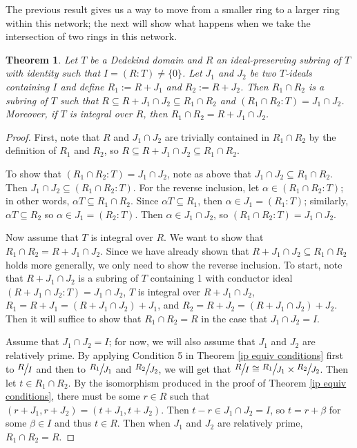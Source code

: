 \documentclass[12pt]{amsart}
\newtheorem{theorem}{Theorem}[section]
\theoremstyle{definition}
\newcommand{\quot}[2]{\large\sfrac{#1}{#2}\normalsize}
\begin{document}
	The previous result gives us a way to move from a smaller ring to a larger ring within this network; the next will show what happens when we take the intersection of two rings in this network.
	
	\begin{theorem}
		\label{ip intersect cond ideals}
		Let $T$ be a Dedekind domain and $R$ an ideal-preserving subring of $T$ with identity such that $I=(R:T)\neq \{0\}$. Let $J_1$ and $J_2$ be two $T$-ideals containing $I$ and define $R_1:=R+J_1$ and $R_2:=R+J_2$. Then $R_1\cap R_2$ is a subring of $T$ such that $R\subseteq R+J_1\cap J_2\subseteq R_1\cap R_2$ and $(R_1\cap R_2:T)=J_1\cap J_2$. Moreover, if $T$ is integral over $R$, then $R_1\cap R_2=R+J_1\cap J_2$.
	\end{theorem}
	
	\begin{proof}
		First, note that $R$ and $J_1\cap J_2$ are trivially contained in $R_1\cap R_2$ by the definition of $R_1$ and $R_2$, so $R\subseteq R+J_1\cap J_2\subseteq R_1\cap R_2$. 
		
		To show that $(R_1\cap R_2:T)=J_1\cap J_2$, note as above that $J_1\cap J_2\subseteq R_1\cap R_2$. Then $J_1\cap J_2\subseteq (R_1\cap R_2:T)$. For the reverse inclusion, let $\alpha\in (R_1\cap R_2:T)$; in other words, $\alpha T\subseteq R_1\cap R_2$. Since $\alpha T\subseteq R_1$, then $\alpha \in J_1=(R_1:T)$; similarly, $\alpha T\subseteq R_2$ so $\alpha\in J_1=(R_2:T)$. Then $\alpha\in J_1\cap J_2$, so $(R_1\cap R_2:T)=J_1\cap J_2$.
		
		Now assume that $T$ is integral over $R$. We want to show that $R_1\cap R_2=R+J_1\cap J_2$. Since we have already shown that $R+J_1\cap J_2\subseteq R_1\cap R_2$ holds more generally, we only need to show the reverse inclusion. To start, note that $R+J_1\cap J_2$ is a subring of $T$ containing 1 with conductor ideal $(R+J_1\cap J_2:T)=J_1\cap J_2$, $T$ is integral over $R+J_1\cap J_2$, $R_1=R+J_1=(R+J_1\cap J_2)+J_1$, and $R_2=R+J_2=(R+J_1\cap J_2)+J_2$. Then it will suffice to show that $R_1\cap R_2=R$ in the case that $J_1\cap J_2=I$.
		
		Assume that $J_1\cap J_2=I$; for now, we will also assume that $J_1$ and $J_2$ are relatively prime. By applying Condition 5 in Theorem \ref{ip equiv conditions} first to $\quot{R}{I}$ and then to $\quot{R_1}{J_1}$ and $\quot{R_2}{J_2}$, we will get that $\quot{R}{I}\cong \quot{R_1}{J_1}\times \quot{R_2}{J_2}$. Then let $t\in R_1\cap R_2$. By the isomorphism produced in the proof of Theorem \ref{ip equiv conditions}, there must be some $r\in R$ such that $(r+J_1,r+J_2)=(t+J_1,t+J_2)$. Then $t-r\in J_1\cap J_2=I$, so $t=r+\beta$ for some $\beta\in I$ and thus $t\in R$. Then when $J_1$ and $J_2$ are relatively prime, $R_1\cap R_2=R$.
		

\end{proof}
\end{document}
